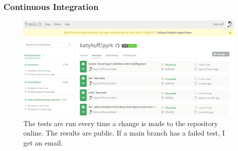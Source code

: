 \begin{frame}[fragile]
  \frametitle{Continuous Integration}
  \begin{figure}[htbp!]
    \begin{center}
    \includegraphics[height=0.6\textheight]{./progress/travis_pyrk.png}
    \end{center}
    \caption{The tests are run every time a change is made to the repository 
    online. The results are public. If a main branch has a failed test, I get 
    an email.} 
    \label{fig:tests_pyrk}
  \end{figure}
\end{frame}

